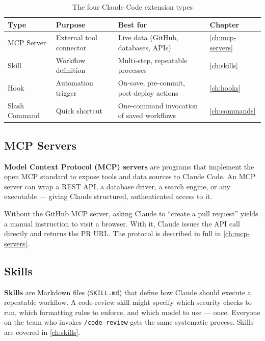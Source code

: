 \begin{table}[ht]
\centering
\caption{The four Claude Code extension types}
\label{tab:plugin-types}
\begin{tabularx}{\textwidth}{llXl}
\toprule
\textbf{Type} & \textbf{Purpose} & \textbf{Best for} & \textbf{Chapter} \\
\midrule
MCP Server    & External tool connector & Live data (GitHub, databases, APIs)
              & \cref{ch:mcp-servers} \\
Skill         & Workflow definition & Multi-step, repeatable processes
              & \cref{ch:skills} \\
Hook          & Automation trigger  & On-save, pre-commit, post-deploy actions
              & \cref{ch:hooks} \\
Slash Command & Quick shortcut      & One-command invocation of saved workflows
              & \cref{ch:commands} \\
\bottomrule
\end{tabularx}
\end{table}

\subsection{MCP Servers}

\textbf{Model Context Protocol (MCP) servers} are programs that implement the
open MCP standard to expose tools and data sources to Claude Code. An MCP
server can wrap a REST API, a database driver, a search engine, or any
executable — giving Claude structured, authenticated access to it.

Without the GitHub MCP server, asking Claude to ``create a pull request'' yields
a manual instruction to visit a browser. With it, Claude issues the API call
directly and returns the PR URL. The protocol is described in full in
\cref{ch:mcp-servers}.

\subsection{Skills}

\textbf{Skills} are Markdown files (\texttt{SKILL.md}) that define how Claude
should execute a repeatable workflow. A code-review skill might specify which
security checks to run, which formatting rules to enforce, and which model to
use — once. Everyone on the team who invokes \texttt{/code-review} gets the
same systematic process. Skills are covered in \cref{ch:skills}.

